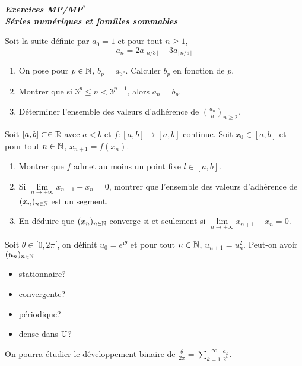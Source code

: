 \documentclass[12pt]{article}
\begin{document}
\begin{titlepage}
	\centering
	\vspace*{\fill}
	\Huge \textit{\textbf{Exercices MP/MP$^*$\\ Séries numériques et familles sommables}}
	\vspace*{\fill}
\end{titlepage}

\begin{exercise}
	Soit la suite définie par $a_{0}=1$ et pour tout $n\geqslant1$,
	$$a_{n}=2a_{\lfloor n/3\rfloor}+3a_{\lfloor n/9\rfloor}$$
	\begin{enumerate}
		\item
		On pose pour $p\in\mathbb{N}$, $b_{p}=a_{3^p}$. Calculer $b_{p}$ en fonction de
		$p$.
		\item
		Montrer que si $3^{p}\leqslant n<3^{p+1}$, alors $a_{n}=b_{p}$.
		\item
		Déterminer l'ensemble des valeurs d'adhérence de
		$(\frac{a_{n}}{n})_{n\geqslant 2}$.
	\end{enumerate}
\end{exercise}

\begin{exercise}
	Soit $[a,b]\subset\in\mathbb{R}$ avec $a<b$ et $f:[a,b]\to[a,b]$ continue. Soit
	$x_{0}\in[a,b]$ et pour tout $n\in\mathbb{N}$, $x_{n+1}=f(x_{n})$.
	\begin{enumerate}
		\item
		Montrer que $f$ admet au moins un point fixe $l\in[a,b]$.
		\item
		Si $\lim\limits_{n\to+\infty}x_{n+1}-x_{n}=0$, montrer que l'ensemble des
		valeurs d'adhérence de $(x_{n})_{n\in\mathbb{N}}$ est un segment.
		\item
		En déduire que $(x_{n})_{n\in\mathbb{N}}$ converge si et seulement si
		$\lim\limits_{n\to+\infty}x_{n+1}-x_{n}=0$.
	\end{enumerate}
\end{exercise}

\begin{exercise}
	Soit $\theta\in[0,2\pi[$, on définit $u_{0}=e^{\mathrm{i}\theta}$ et pour tout
	$n\in\mathbb{N}$, $u_{n+1}=u_{n}^{2}$. Peut-on avoir $(u_{n})_{n\in\mathbb{N}}$
	\begin{itemize}
		\item
		stationnaire?
		\item
		convergente?
		\item
		périodique?
		\item
		dense dans $\mathbb{U}$?
	\end{itemize}
	On pourra étudier le développement binaire de
	$\frac{\theta}{2\pi}=\sum_{k=1}^{+\infty}\frac{a_{k}}{2^{k}}$.
\end{exercise}
\end{document}
